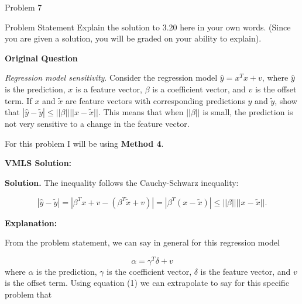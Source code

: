 \begin{problem}{Problem 7}
    \begin{statement}{Problem Statement}
        Explain the solution to 3.20 here in your own words. (Since you are given a solution, you will be graded on your ability to explain). \vspace*{1em}

        \textbf{Original Question} \vspace*{1em}

        \textit{Regression model sensitivity}. Consider the regression model $\hat{y} = x^{T}x + v$, where $\hat{y}$ is the prediction, $x$ is a feature vector, $\beta$ is a coefficient vector, and
        $v$ is the offset term. If $x$ and $\tilde{x}$ are feature vectors with corresponding predictions $\hat{y}$ and $\tilde{y}$, show that $|\hat{y} - \tilde{y}| \leq ||\beta|| ||x - \tilde{x}||$.
        This means that when $||\beta||$ is small, the prediction is not very sensitive to a change in the feature vector.
    \end{statement}

    \begin{highlight}[Solution]
        For this problem I will be using \textbf{Method 4}. \vspace*{1em}

        \textbf{VMLS Solution:} \vspace*{1em}

        \textbf{Solution.} The inequality follows the Cauchy-Schwarz inequality:

        \begin{equation*}
            |\hat{y} - \tilde{y}| = |\beta^{T}x + v - (\beta^{T}\tilde{x} + v)| = |\beta^{T}(x - \tilde{x})| \leq ||\beta||||x - \tilde{x}||.
        \end{equation*}

        \textbf{Explanation:} \vspace*{1em}

        From the problem statement, we can say in general for this regression model

        \setcounter{equation}{0}
        \begin{equation}
            \alpha = \gamma^{T}\delta + v
        \end{equation}
        where $\alpha$ is the prediction, $\gamma$ is the coefficient vector, $\delta$ is the feature vector, and $v$ is the offset term. Using equation (1) we can extrapolate to say for this specific
        problem that


\end{highlight}
\end{problem}
